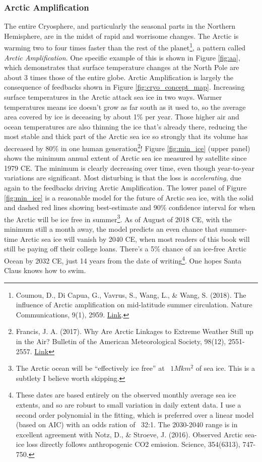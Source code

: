 \subsubsection{Arctic Amplification}\label{aa} The entire Cryosphere, and particularly the seasonal parts in the Northern Hemisphere, are in the midst of rapid and worrisome changes. The Arctic is warming two to four times faster than the rest of the planet\footnote{Coumou, D., Di Capua, G., Vavrus, S., Wang, L., \& Wang, S. (2018). The influence of Arctic amplification on mid-latitude summer circulation. Nature Communications, 9(1), 2959. \href{https://doi.org/10.1038/s41467-018-05256-8}{Link}.}, a pattern called \emph{Arctic Amplification}. One specific example of this is shown in Figure \ref{fig:aa}, which demonstrates that surface temperature changes at the North Pole are about 3 times those of the entire globe. Arctic Amplification is largely the consequence of feedbacks shown in Figure \ref{fig:cryo_concept_map}. Increasing surface temperatures in the Arctic attack sea ice in two ways. Warmer temperatures means ice doesn't grow as far south as it used to, so the average area covered by ice is deceasing by about 1\% per year. Those higher air and ocean temperatures are also thinning the ice that's already there, reducing the most stable and thick part of the Arctic sea ice so strongly that its volume has decreased by 80\% in one human generation\footnote{Francis, J. A. (2017). Why Are Arctic Linkages to Extreme Weather Still up in the Air? Bulletin of the American Meteorological Society, 98(12), 2551-2557. \href{https://doi.org/10.1175/BAMS-D-17-0006.1}{Link}}! Figure \ref{fig:min_ice} (upper panel) shows the minimum annual extent of Arctic sea ice measured by satellite since 1979 CE. The minimum is clearly decreasing over time, even though year-to-year variations are significant. Most disturbing is that the loss is \emph{accelerating}, due again to the feedbacks driving Arctic Amplification. The lower panel of Figure \ref{fig:min_ice} is a reasonable model for the future of Arctic sea ice, with the solid and dashed red lines showing best-estimate and 90\% confidence interval for when the Arctic will be ice free in summer\footnote{The Arctic ocean will be ``effectively ice free'' at ~$1 Mkm^2$ of sea ice. This is a subtlety I believe worth skipping.}. As of August of 2018 CE, with the minimum still a month away, the model predicts an even chance that summer-time Arctic sea ice will vanish by 2040 CE, when most readers of this book will still be paying off their college loans. There's a 5\% chance of an ice-free Arctic Ocean by 2032 CE, just 14 years from the date of writing\footnote{These dates are based entirely on the observed monthly average sea ice extents, and so are robust to small variation in daily extent data. I use a second order polynomial in the fitting, which is preferred over a linear model (based on AIC) with an odds ration of ~32:1. The 2030-2040 range is in excellent agreement with Notz, D., \& Stroeve, J. (2016). Observed Arctic sea-ice loss directly follows anthropogenic CO2 emission. Science, 354(6313), 747-750.}. One hopes Santa Claus knows how to swim.\\
 
